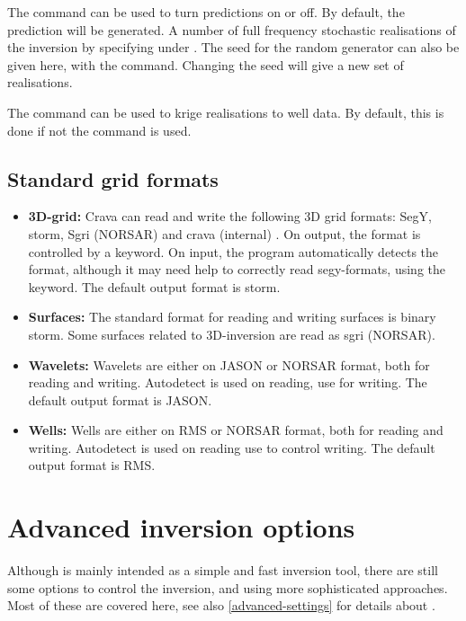 The command  can be used to turn predictions on or off. By default, the prediction will be generated. A number of full frequency stochastic realisations of the inversion by specifying  under . The seed for the random generator can also be given here, with the  command. Changing the seed will give a new set of realisations.

The command  can be used to krige realisations to well data. By default, this is done if not the  command is used.

\subsection{Standard grid formats}
\label{sec:gridformats}
\begin{itemize}
\item {\bf 3D-grid:} Crava can read and write the following 3D grid
  formats: SegY, storm, Sgri (NORSAR) and crava (internal) . On
  output, the format is controlled by a  keyword. On input,
  the program automatically detects the format, although it may need
  help to correctly read segy-formats, using the 
  keyword. The default output format is storm.

\item {\bf Surfaces:} The standard format for reading and writing
  surfaces is binary storm. Some surfaces related to 3D-inversion are
  read as sgri (NORSAR).

\item {\bf Wavelets:} Wavelets are either on JASON or NORSAR format,
  both for reading and writing. Autodetect is used on reading, use 
  for writing. The default output format is JASON.

\item{\bf Wells:} Wells are either on RMS or NORSAR format, both for
  reading and writing. Autodetect is used on reading use  to
  control writing. The default output format is RMS.

\end{itemize}


\section{Advanced inversion options}
\label{sec:advinvusr}
Although \crava is mainly intended as a simple and fast inversion tool, there are still some options to control the inversion, and using more sophisticated approaches. Most of these are covered here, see also \autoref{advanced-settings} for details about .
